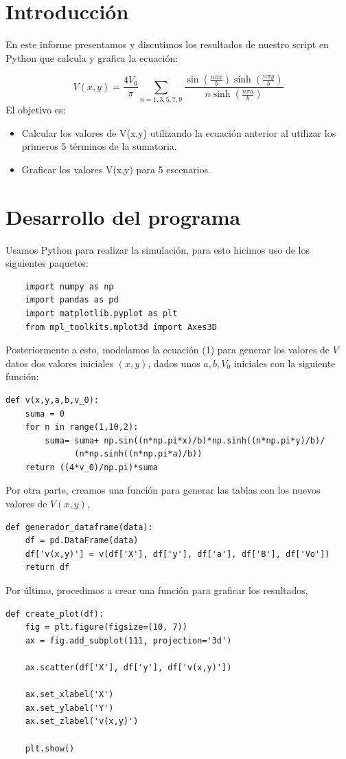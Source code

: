 




\section{Introducción}
En este informe presentamos y discutimos los resultados de nuestro script en Python que calcula y grafica la ecuación:

\begin{equation}
V(x, y) = \frac{4V_0}{\pi}\sum_{n=1,3,5,7,9}\frac{ \sin \left(\frac{n \pi x}{b}\right) \sinh \left(\frac{n \pi y}{b}\right)}{n \sinh \left(\frac{n \pi a}{b}\right)}
\end{equation}
El objetivo es:
\begin{itemize}
    \item Calcular los valores de V(x,y) utilizando la ecuación anterior al utilizar los primeros 5 términos de la sumatoria.
    \item Graficar los valores V(x,y) para 5 escenarios.
\end{itemize}

\section{Desarrollo del programa}

Usamos Python para realizar la simulación, para esto hicimos uso de los siguientes paquetes: 
\begin{verbatim}
    import numpy as np
    import pandas as pd
    import matplotlib.pyplot as plt
    from mpl_toolkits.mplot3d import Axes3D
\end{verbatim}
Posteriormente a esto, modelamos la ecuación (1) para generar los valores de $V$ datos dos valores iniciales $(x,y)$, dados unos $a,b,V_0$ iniciales con la siguiente función: 
\begin{verbatim}
def v(x,y,a,b,v_0):
    suma = 0
    for n in range(1,10,2):
        suma= suma+ np.sin((n*np.pi*x)/b)*np.sinh((n*np.pi*y)/b)/
              (n*np.sinh((n*np.pi*a)/b))
    return ((4*v_0)/np.pi)*suma
\end{verbatim} 
Por otra parte, creamos una función para generar las tablas con los nuevos valores de $V(x,y)$,
\begin{verbatim}
def generador_dataframe(data):
    df = pd.DataFrame(data)
    df['v(x,y)'] = v(df['X'], df['y'], df['a'], df['B'], df['Vo'])
    return df
\end{verbatim}
Por último, procedimos a crear una función para graficar los resultados, 
\begin{verbatim}
def create_plot(df):
    fig = plt.figure(figsize=(10, 7))
    ax = fig.add_subplot(111, projection='3d')

    ax.scatter(df['X'], df['y'], df['v(x,y)'])

    ax.set_xlabel('X')
    ax.set_ylabel('Y')
    ax.set_zlabel('v(x,y)')

    plt.show()
\end{verbatim}

